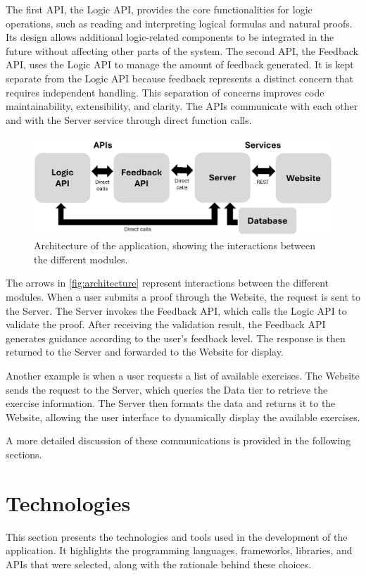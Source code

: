 The first API, the Logic API, provides the core functionalities for logic operations, such as reading and interpreting logical formulas and natural proofs. Its design allows additional logic-related components to be integrated in the future without affecting other parts of the system. The second API, the Feedback API, uses the Logic API to manage the amount of feedback generated. It is kept separate from the Logic API because feedback represents a distinct concern that requires independent handling. This separation of concerns improves code maintainability, extensibility, and clarity. The APIs communicate with each other and with the Server service through direct function calls.

\begin{figure}
    \centering
    \includegraphics[width=0.95\linewidth]{Chapters/Figures/architeture.png}
    \caption{Architecture of the application, showing the interactions between the different modules.}
    \label{fig:architecture}
\end{figure}

The arrows in \autoref{fig:architecture} represent interactions between the different modules. When a user submits a proof through the Website, the request is sent to the Server. The Server invokes the Feedback API, which calls the Logic API to validate the proof. After receiving the validation result, the Feedback API generates guidance according to the user’s feedback level. The response is then returned to the Server and forwarded to the Website for display.

Another example is when a user requests a list of available exercises. The Website sends the request to the Server, which queries the Data tier to retrieve the exercise information. The Server then formats the data and returns it to the Website, allowing the user interface to dynamically display the available exercises.

A more detailed discussion of these communications is provided in the following sections.

\section{Technologies}
This section presents the technologies and tools used in the development of the application. It highlights the programming languages, frameworks, libraries, and APIs that were selected, along with the rationale behind these choices.


